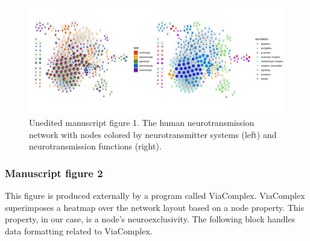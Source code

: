 \begin{figure}

{\centering \includegraphics{figs/analysis.network.unnamed-chunk-8-1} 

}

\caption{Unedited manuscript figure 1. The human neurotransmission network with nodes colored by neurotransmitter systems (left) and neurotransmission functions (right).}\label{fig:unnamed-chunk-8}
\end{figure}

\begin{Shaded}
\begin{Highlighting}[]
\NormalTok{(}\NormalTok{, } \NormalTok{, } \NormalTok{, }
\end{Highlighting}
\end{Shaded}

\hypertarget{manuscript-figure-2}{%
\subsubsection{Manuscript figure 2}\label{manuscript-figure-2}}

This figure is produced externally by a program called ViaComplex.
ViaComplex superimposes a heatmap over the network layout based on a
node property. This property, in our case, is a node's neuroexclusivity.
The following block handles data formatting related to ViaComplex.


